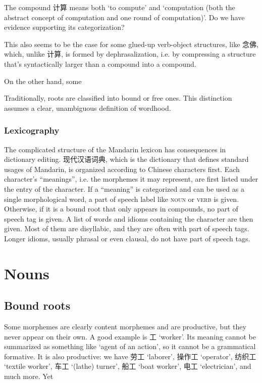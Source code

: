 \documentclass[UTF8, a4paper, oneside, scheme=plain, 12pt]{ctexrep}
\newcommand{\translate}[1]{`#1'}
\newcommand*{\category}[1]{\textsc{#1}}
\begin{document}
The compound 计算 means both \translate{to compute} and \translate{computation
(both the abstract concept of computation and one round of computation)}.
Do we have evidence supporting its categorization?

This also seems to be the case for some glued-up verb-object structures,
like 念佛, which, unlike 计算, is formed by dephrasalization,
i.e. by compressing a structure that's syntactically larger than a compound into a compound.

On the other hand, some 

Traditionally, roots are classified into bound or free ones.
This distinction assumes a clear, unambiguous definition of wordhood.

\subsection{Lexicography}

The complicated structure of the Mandarin lexicon has consequences in dictionary editing.
现代汉语词典, which is the dictionary that defines standard usages of Mandarin,
is organized according to Chinese characters first.
Each character's ``meanings'',
i.e. the morphemes it may represent,
are first listed under the entry of the character.
If a ``meaning'' is categorized and can be used as a single morphological word,
a part of speech label like \category{noun} or \category{verb} is given.
Otherwise, if it is a bound root that only appears in compounds,
no part of speech tag is given.
A list of words and idioms containing the character are then given.
Most of them are disyllabic, and they are often with part of speech tags.
Longer idioms, usually phrasal or even clausal,
do not have part of speech tags.

\chapter{Nouns}

\section{Bound roots}

Some morphemes are clearly content morphemes and are productive,
but they never appear on their own.
A good example is 工 \translate{worker}.
Its meaning cannot be summarized as something like \translate{agent of an action},
so it cannot be a grammatical formative.
It is also productive:
we have 劳工 \translate{laborer}, 操作工 \translate{operator}, 纺织工 \translate{textile worker}, 车工 \translate{(lathe) turner}, 船工 \translate{boat worker}, 电工 \translate{electrician}, and much more.
Yet 
\end{document}
